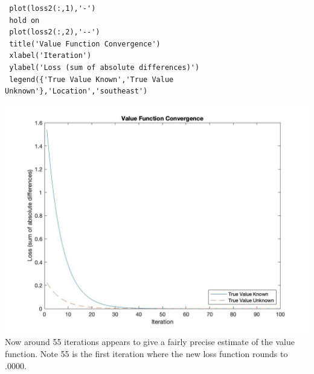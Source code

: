 \documentclass[12pt]{article}
\begin{document}
\begin{onehalfspace}
\begin{enumerate}[1.]
\begin{lstlisting}
 plot(loss2(:,1),'-')
 hold on
 plot(loss2(:,2),'--')
 title('Value Function Convergence')
 xlabel('Iteration')
 ylabel('Loss (sum of absolute differences)')
 legend({'True Value Known','True Value Unknown'},'Location','southeast')
	\end{lstlisting}
	\includegraphics[width=\textwidth]{Econ_8307_PS2_4_4.jpg}
	Now around 55 iterations appears to give a fairly precise estimate of the value function. Note 55 is the first iteration where the new loss function rounds to .0000.
\end{enumerate}



\end{onehalfspace}
\end{document}
